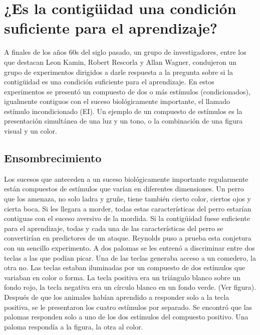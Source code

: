 \documentclass[
  letterpaper,
]{book}
\begin{document}
\section{¿Es la contigüidad una condición suficiente para el
aprendizaje?}\label{es-la-contiguxfcidad-una-condiciuxf3n-suficiente-para-el-aprendizaje}

A finales de los años 60s del siglo pasado, un grupo de investigadores,
entre los que destacan Leon Kamin, Robert Rescorla y Allan Wagner,
condujeron un grupo de experimentos dirigidos a darle respuesta a la
pregunta sobre si la contigüidad es una condición suficiente para el
aprendizaje. En estos experimentos se presentó un compuesto de dos o más
estímulos (condicionados), igualmente contiguos con el suceso
biológicamente importante, el llamado estímulo incondicionado (EI). Un
ejemplo de un compuesto de estímulos es la presentación simultánea de
una luz y un tono, o la combinación de una figura visual y un color.

\subsection{Ensombrecimiento}\label{ensombrecimiento}

Los sucesos que anteceden a un suceso biológicamente importante
regularmente están compuestos de estímulos que varían en diferentes
dimensiones. Un perro que los amenaza, no solo ladra y gruñe, tiene
también cierto color, ciertos ojos y cierta boca. Si les llegara a
morder, todas estas características del perro estarían contiguas con el
suceso aversivo de la mordida. Si la contigüidad fuese suficiente para
el aprendizaje, todas y cada una de las características del perro se
convertirían en predictores de un ataque. Reynolds puso a prueba esta
conjetura con un sencillo experimento. A dos palomas se les entrenó a
discriminar entre dos teclas a las que podían picar. Una de las teclas
generaba acceso a un comedero, la otra no. Las teclas estaban iluminadas
por un compuesto de dos estímulos que variaban en color o forma. La
tecla positiva era un triángulo blanco sobre un fondo rojo, la tecla
negativa era un círculo blanco en un fondo verde. (Ver figura). Después
de que los animales habían aprendido a responder solo a la tecla
positiva, se le presentaron los cuatro estímulos por separado. Se
encontró que las palomas responden solo a uno de los dos estímulos del
compuesto positivo. Una paloma respondía a la figura, la otra al color.
\end{document}
